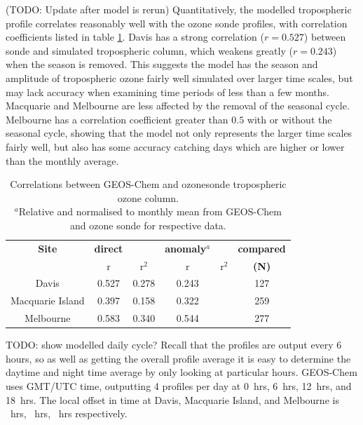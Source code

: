     (TODO: Update after model is rerun)
    Quantitatively, the modelled tropospheric profile correlates reasonably well with the ozone sonde profiles, with correlation coefficients listed in table \ref{ch_o3:tab:station_correlations}.
    Davis has a strong correlation ($r=0.527$) between sonde and simulated tropospheric column, which weakens greatly ($r=0.243$) when the season is removed.
    This suggests the model has the season and amplitude of tropospheric ozone fairly well simulated over larger time scales, but may lack accuracy when examining time periods of less than a few months.
    Macquarie and Melbourne are less affected by the removal of the seasonal cycle.
    Melbourne has a correlation coefficient greater than $0.5$ with or without the seasonal cycle, showing that the model not only represents the larger time scales fairly well, but also has some accuracy catching days which are higher or lower than the monthly average.
    
    \begin{table}
    \begin{tabular}{ | c  c  c  c  c  c | }
      \hline
      \textbf{Site} & \textbf{direct} & & \textbf{anomaly$^a$} & & \textbf{compared}
      \\            & r  & r$^2$      & r & r$^2$   & \textbf{(N)}
      \\ \hline
      Davis & 0.527 & 0.278 & 0.243 & & 127
      \\
      Macquarie Island &  0.397 & 0.158 & 0.322 & & 259
      \\ %
      Melbourne & 0.583 & 0.340 & 0.544 & & 277
      \\ \hline
    \end{tabular}
    \caption{Correlations between GEOS-Chem and ozonesonde tropospheric ozone column.
      \hspace{\textwidth} \\ 
      ${}^a$Relative and normalised to monthly mean from GEOS-Chem and ozone sonde for respective data. \hspace{\textwidth} \\ }
    \label{ch_o3:tab:station_correlations}
    \end{table}
        
    TODO: show modelled daily cycle?
    Recall that the profiles are output every 6 hours, so as well as getting the overall profile average it is easy to determine the daytime and night time average by only looking at particular hours.
    GEOS-Chem uses GMT/UTC time, outputting 4 profiles per day at 0~hrs, 6~hrs, 12~hrs, and 18~hrs.
    The local offset in time at Davis, Macquarie Island, and Melbourne is ~hrs, ~hrs, ~hrs respectively.
    
